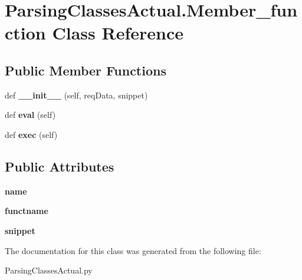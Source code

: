 \hypertarget{class_parsing_classes_actual_1_1_member__function}{}\section{Parsing\+Classes\+Actual.\+Member\+\_\+function Class Reference}
\label{class_parsing_classes_actual_1_1_member__function}
\subsection*{Public Member Functions}
\begin{DoxyCompactItemize}
\item 
def {\bfseries \+\_\+\+\_\+init\+\_\+\+\_\+} (self, req\+Data, snippet)\hypertarget{class_parsing_classes_actual_1_1_member__function_abebf3cf5db29a8776c3144d7a7cf4fac}{}\label{class_parsing_classes_actual_1_1_member__function_abebf3cf5db29a8776c3144d7a7cf4fac}

\item 
def {\bfseries eval} (self)\hypertarget{class_parsing_classes_actual_1_1_member__function_a33449b8ca04728cd8fe854830aa1d730}{}\label{class_parsing_classes_actual_1_1_member__function_a33449b8ca04728cd8fe854830aa1d730}

\item 
def {\bfseries exec} (self)\hypertarget{class_parsing_classes_actual_1_1_member__function_aafcfb847d09b4dc16428bf10dd596bc1}{}\label{class_parsing_classes_actual_1_1_member__function_aafcfb847d09b4dc16428bf10dd596bc1}

\end{DoxyCompactItemize}
\subsection*{Public Attributes}
\begin{DoxyCompactItemize}
\item 
{\bfseries name}\hypertarget{class_parsing_classes_actual_1_1_member__function_ab05a5b7f454a630168fa27b9b543200d}{}\label{class_parsing_classes_actual_1_1_member__function_ab05a5b7f454a630168fa27b9b543200d}

\item 
{\bfseries functname}\hypertarget{class_parsing_classes_actual_1_1_member__function_a92b7dd050cca1f1fc59553b4f3d45223}{}\label{class_parsing_classes_actual_1_1_member__function_a92b7dd050cca1f1fc59553b4f3d45223}

\item 
{\bfseries snippet}\hypertarget{class_parsing_classes_actual_1_1_member__function_a819f607e7531d89e9c5954567e8373f8}{}\label{class_parsing_classes_actual_1_1_member__function_a819f607e7531d89e9c5954567e8373f8}

\end{DoxyCompactItemize}


The documentation for this class was generated from the following file\+:\begin{DoxyCompactItemize}
\item 
Parsing\+Classes\+Actual.\+py\end{DoxyCompactItemize}
